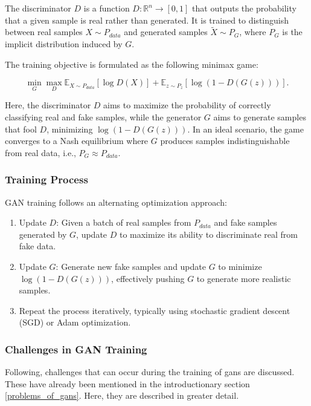 The discriminator \(D\) is a function \(D: \mathbb{R}^n \to [0,1]\) that outputs the probability that a given sample is real rather than generated. It is trained to distinguish between real samples \(X \sim P_{data}\) and generated samples \(\tilde{X} \sim P_G\), where \(P_G\) is the implicit distribution induced by \(G\).

The training objective is formulated as the following minimax game:

    \begin{equation}\label{theory_gan_vanilla_formula}
        \min_G \max_D \mathbb{E}_{X \sim P_{data}} [\log D(X)] + \mathbb{E}_{z \sim P_z} [\log (1 - D(G(z)))].
    \end{equation}

Here, the discriminator \(D\) aims to maximize the probability of correctly classifying real and fake samples, while the generator \(G\) aims to generate samples that fool \(D\), minimizing \(\log(1 - D(G(z)))\). In an ideal scenario, the game converges to a Nash equilibrium where \(G\) produces samples indistinguishable from real data, i.e., \(P_G \approx P_{data}\).



\subsubsection{Training Process}\label{theoretical_gan_training}
GAN training follows an alternating optimization approach:
\begin{enumerate}
    \item Update \(D\): Given a batch of real samples from \(P_{data}\) and fake samples generated by \(G\), update \(D\) to maximize its ability to discriminate real from fake data.
    \item Update \(G\): Generate new fake samples and update \(G\) to minimize \\ \(\log(1 - D(G(z)))\), effectively pushing \(G\) to generate more realistic samples.
    \item Repeat the process iteratively, typically using stochastic gradient descent (SGD) or Adam optimization.
\end{enumerate}


\newpage

\subsubsection{Challenges in GAN Training}\label{theory_gan_problems}
Following, challenges that can occur during the training of gans are discussed. These have already been mentioned in the introductionary section \ref{problems_of_gans}. Here, they are described in greater detail.
